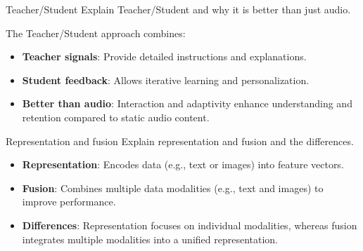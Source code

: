 \documentclass{article}
\begin{document}
\begin{exercise}{Teacher/Student}
  Explain Teacher/Student and why it is better than just audio.

  \begin{solution}
    The Teacher/Student approach combines:
    \begin{itemize}
        \item \textbf{Teacher signals}: Provide detailed instructions and explanations.
        \item \textbf{Student feedback}: Allows iterative learning and personalization.
        \item \textbf{Better than audio}: Interaction and adaptivity enhance understanding and retention compared to static audio content.
    \end{itemize}
  \end{solution}
\end{exercise}

\begin{exercise}{Representation and fusion}
  Explain representation and fusion and the differences.

  \begin{solution}
    \begin{itemize}
        \item \textbf{Representation}: Encodes data (e.g., text or images) into feature vectors.
        \item \textbf{Fusion}: Combines multiple data modalities (e.g., text and images) to improve performance.
        \item \textbf{Differences}: Representation focuses on individual modalities, whereas fusion integrates multiple modalities into a unified representation.
    \end{itemize}
  \end{solution}
\end{exercise}
\end{document}
